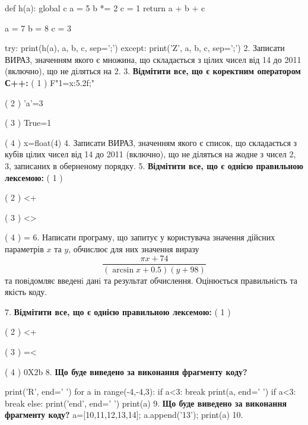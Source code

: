 \documentclass[11pt]{article}
\begin{document}
{{{{def h(a):
global c    a = 5
    b *= 2
    c = 1
    return a + b + c

a = 7
b = 8
c = 3

try:
    print(h(a), a, b, c, sep=';')
except:
    print('Z', a, b, c, sep=';')
\vspace{5mm}
2. 
Записати ВИРАЗ, значенням якого є множина, що складається з цілих чисел від 14 до 2011 (включно), що не діляться на 2.\vspace{5mm}
3. %
\textbf{Відмітити все, що є коректним оператором С++:}
( 1 ) F"1={x:5.2f};"

( 2 ) 'a'=3

( 3 ) True=1

( 4 ) x=float(4)
\vspace{5mm}
4. 
Записати ВИРАЗ, значенням якого є список, що складається з кубів цілих чисел від 14 до 2011 (включно), що не діляться на жодне з чисел 2, 3, записаних в оберненому порядку.\vspace{5mm}
5. %
\textbf{Відмітити все, що є однією правильною лексемою:}
( 1 ) {

( 2 ) <+

( 3 ) <>

( 4 ) =
\vspace{5mm}
6. 
Написати програму, що запитує у користувача значення дійсних параметрів $x$ та $y$, обчислює для них значення виразу 
$$\frac{\pi x + 74}{(\arcsin x + 0.5) (y + 98)}$$ 
та повiдомляє введенi данi та результат обчислення.
 Оцінюється правильність та якість коду.

\vspace{5mm}
7. %
\textbf{Відмітити все, що є однією правильною лексемою:}
( 1 ) {

( 2 ) <+

( 3 ) =<

( 4 ) 0X2b
\vspace{5mm}
8. \textbf{Що буде виведено за виконання фрагменту коду?}

print('R', end=' ')
for a in range(-4,-4,3):
    if a<3:
        break
        print(a, end=' ')
    if a<3:
        break
    else:
        print('end', end=' ')
    print(a)
\vspace{5mm}
9. \textbf{Що буде виведено за виконання фрагменту коду?}
a=[10,11,12,13,14]; a.append('13'); print(a)\vspace{5mm}
10. 

}}}}}}
\end{document}
